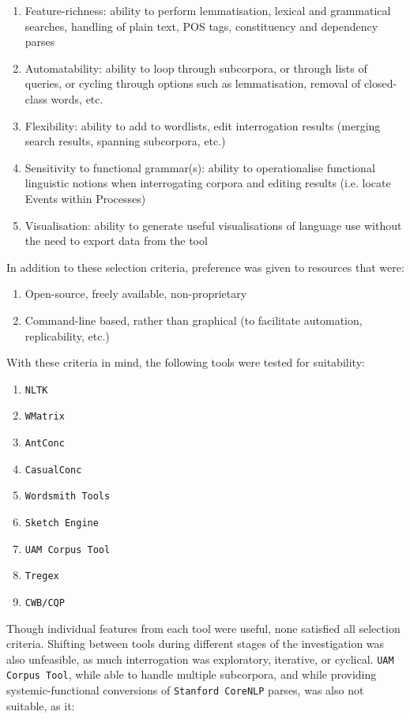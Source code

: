 \begin{enumerate}
\item Feature-richness: ability to perform lemmatisation, lexical and grammatical searches, handling of plain text, \gls{POS} tags, constituency and dependency parses
\item Automatability: ability to loop through subcorpora, or through lists of queries, or cycling through options such as lemmatisation, removal of closed\hyp{}class words, etc.
\item Flexibility: ability to add to wordlists, edit interrogation results (merging search results, spanning subcorpora, etc.)
\item Sensitivity to functional grammar(s): ability to operationalise functional linguistic notions when interrogating corpora and editing results (i.e. locate Events within Processes)
\item Visualisation: ability to generate useful visualisations of language use without the need to export data from the tool
\end{enumerate}
%
In addition to these selection criteria, preference was given to resources that were:
%
\begin{enumerate}
\item Open-source, freely available, non\hyp{}proprietary
\item Command\hyp{}line based, rather than graphical (to facilitate automation, replicability, etc.)
\end{enumerate}
%
With these criteria in mind, the following tools were tested for suitability:
%
\begin{multicols}{3}
\begin{enumerate}
\item \texttt{NLTK}
\item \texttt{WMatrix}
\item \texttt{AntConc}
\item \texttt{CasualConc}
\item \texttt{Wordsmith Tools}
\item \texttt{Sketch Engine}
\item \texttt{UAM Corpus Tool}
\item \texttt{Tregex}
\item \texttt{\gls{CWB}\slash CQP}
\end{enumerate}
\end{multicols}
%
\noindent Though individual features from each tool were useful, none satisfied all selection criteria. Shifting between tools during different stages of the investigation was also unfeasible, as much interrogation was exploratory, iterative, or cyclical. \texttt{UAM Corpus Tool}, while able to handle multiple subcorpora, and while providing systemic\hyp{}functional conversions of \texttt{Stanford CoreNLP} parses, was also not suitable, as it:
